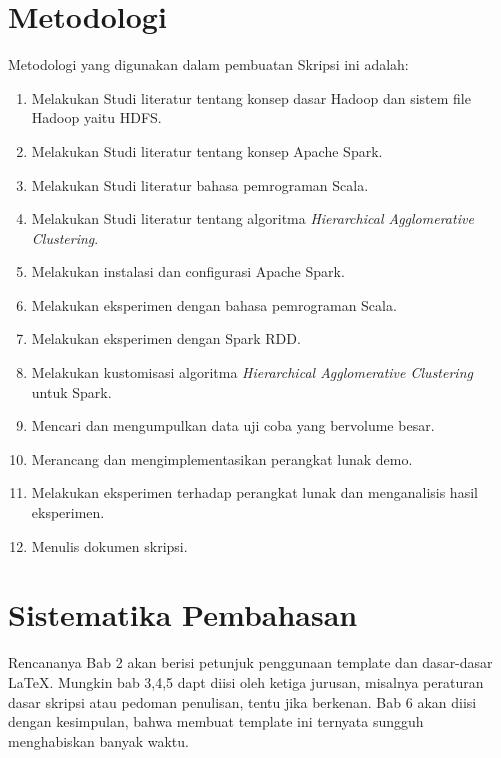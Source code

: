 \section{Metodologi}
\label{sec:metlit}
Metodologi yang digunakan dalam pembuatan Skripsi ini adalah:
\begin{enumerate}

\item Melakukan Studi literatur tentang konsep dasar Hadoop dan sistem file Hadoop yaitu HDFS.

\item Melakukan Studi literatur tentang konsep Apache Spark.

\item Melakukan Studi literatur bahasa pemrograman Scala.

\item Melakukan Studi literatur tentang algoritma {\it Hierarchical Agglomerative Clustering}.

\item Melakukan instalasi dan configurasi Apache Spark.

\item Melakukan eksperimen dengan bahasa pemrograman Scala.

\item Melakukan eksperimen dengan Spark RDD.

\item Melakukan kustomisasi algoritma {\it Hierarchical Agglomerative Clustering} untuk Spark.

\item Mencari dan mengumpulkan data uji coba yang bervolume besar.

\item Merancang dan mengimplementasikan perangkat lunak demo.

\item Melakukan eksperimen terhadap perangkat lunak dan menganalisis hasil eksperimen.

\item Menulis dokumen skripsi.




\end{enumerate}

\section{Sistematika Pembahasan}
\label{sec:sispem}
Rencananya Bab 2 akan berisi petunjuk penggunaan template dan dasar-dasar \LaTeX.
Mungkin bab 3,4,5 dapt diisi oleh ketiga jurusan, misalnya peraturan dasar skripsi atau pedoman penulisan, tentu jika berkenan.
Bab 6 akan diisi dengan kesimpulan, bahwa membuat template ini ternyata sungguh menghabiskan banyak waktu.

